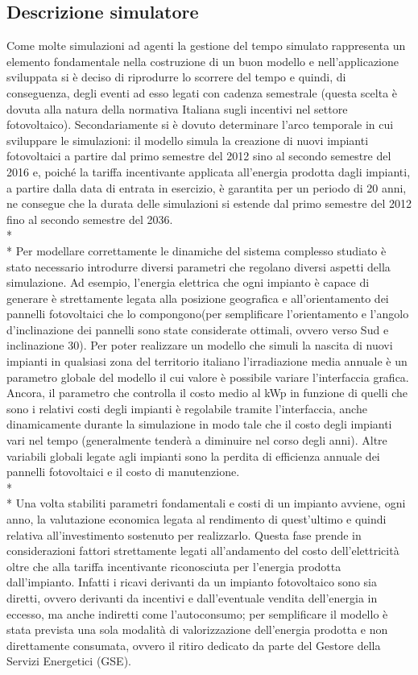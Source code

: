 \subsection{Descrizione simulatore}
Come molte simulazioni ad agenti la gestione del tempo simulato rappresenta un elemento fondamentale nella costruzione di un buon modello e nell'applicazione sviluppata si è deciso di riprodurre lo scorrere del tempo e quindi, di conseguenza, degli eventi ad esso legati con cadenza semestrale (questa scelta è dovuta alla natura della normativa Italiana sugli incentivi nel settore fotovoltaico). Secondariamente si è dovuto determinare l'arco temporale in cui sviluppare le simulazioni: il modello simula la creazione di nuovi impianti fotovoltaici a partire dal primo semestre del 2012 sino al secondo semestre del 2016 e, poiché la tariffa incentivante applicata all'energia prodotta dagli impianti, a partire dalla data di entrata in esercizio, è garantita per un periodo di 20 anni, ne consegue che la durata delle simulazioni si estende dal primo semestre del 2012 fino al secondo semestre del 2036.
\\* \\*
Per modellare correttamente le dinamiche del sistema complesso studiato è stato necessario introdurre diversi parametri che regolano diversi aspetti della simulazione. Ad esempio, l'energia elettrica che ogni impianto è capace di generare è strettamente legata alla posizione geografica e all'orientamento dei pannelli fotovoltaici che lo compongono(per semplificare l'orientamento e l'angolo d'inclinazione dei pannelli sono state considerate ottimali, ovvero verso Sud e inclinazione 30\textdegree). Per poter realizzare un modello che simuli la nascita di nuovi impianti in qualsiasi zona del territorio italiano l'irradiazione media annuale è un parametro globale del modello il cui valore è possibile variare l'interfaccia grafica. Ancora, il parametro che controlla il costo medio al kWp in funzione di quelli che sono i relativi costi degli impianti è regolabile tramite l'interfaccia, anche dinamicamente durante la simulazione in modo tale che il costo degli impianti vari nel tempo (generalmente tenderà a diminuire nel corso degli anni). Altre variabili globali legate agli impianti sono la perdita di efficienza annuale dei pannelli fotovoltaici e il costo di manutenzione.
\\* \\*
Una volta stabiliti parametri fondamentali e costi di un impianto avviene, ogni anno, la valutazione economica legata al rendimento di quest'ultimo e quindi relativa all'investimento sostenuto per realizzarlo. Questa fase prende in considerazioni fattori strettamente legati all'andamento del costo dell'elettricità oltre che alla tariffa incentivante riconosciuta per l'energia prodotta dall'impianto. Infatti i ricavi derivanti da un impianto fotovoltaico sono sia diretti, ovvero derivanti da incentivi e dall'eventuale vendita dell'energia in eccesso, ma anche indiretti come l'autoconsumo; per semplificare il modello è stata prevista una sola modalità di valorizzazione dell'energia prodotta e non direttamente consumata, ovvero il ritiro dedicato da parte del Gestore della Servizi Energetici (GSE).


